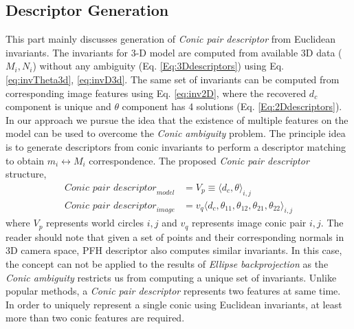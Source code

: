 \documentclass{bmvc2k}
\begin{document}
\subsection{Descriptor Generation}\label{ssec:descriptor}
This part mainly discusses generation of \textit{Conic pair descriptor} from Euclidean invariants. 
The invariants for 3-D model are computed from available 3D data ($M_i,N_i$) without any ambiguity (Eq. \ref{Eq:3Ddescriptors}) using Eq. \ref{eq:invTheta3d}, \ref{eq:invD3d}. 
The same set of invariants can be computed from corresponding image features using Eq. \ref{eq:inv2D}, where the recovered $ d_c $ component is unique and $ \theta $ component has 4 solutions (Eq. \ref{Eq:2Ddescriptors}). 
In our approach we pursue the idea that the existence of multiple features on the model can be used to overcome the \textit{Conic ambiguity} problem. 
The principle idea is to generate descriptors from conic invariants to perform a descriptor matching to obtain $ m_i \leftrightarrow M_i $ correspondence.
The proposed \textit{Conic pair descriptor} structure,
\begin{align}
\textit{Conic pair descriptor}_{model} &= V_{p} \equiv \langle d_c,\theta \rangle_{i,j} \label{Eq:3Ddescriptors} \\
\textit{Conic pair descriptor}_{image} &= v_{q} \langle  d_c,\theta_{11},\theta_{12},\theta_{21},\theta_{22} \rangle_{i,j} \label{Eq:2Ddescriptors} 
\end{align}
where $V_{p}$ represents world circles $i,j$ and $v_{q}$ represents image conic pair $i,j$. 
The reader should note that given a set of points and their corresponding normals in 3D camera space, PFH descriptor \cite{RusuDoctoralDissertation} also computes similar invariants. In this case, the concept can not be applied to the results of \textit{Ellipse backprojection} as the \textit{Conic ambiguity} restricts us from computing a unique set of invariants. 
Unlike popular methods, a \textit{Conic pair descriptor} represents two features at same time. 
In order to uniquely represent a single conic using Euclidean invariants, at least more than two conic features are required. 
\end{document}
